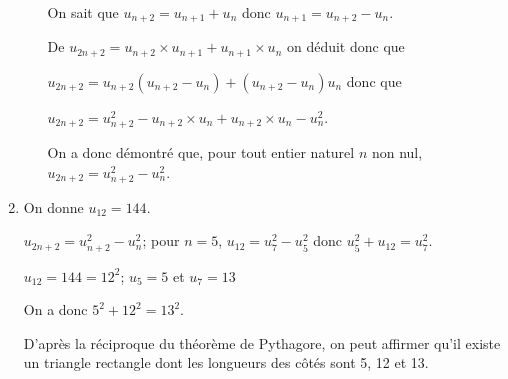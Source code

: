 \documentclass[10pt,a4paper]{article}
\begin{document}
\begin{enumerate}
\begin{enumerate}
On sait que $u_{n+2}=u_{n+1}+u_n$ donc $u_{n+1}=u_{n+2} -u_n$.

De $u_{2n+2} = u_{n+2}\times u_{n+1} + u_{n+1}\times u_n$
on déduit donc que

$u_{2n+2} = u_{n+2}\left ( u_{n+2} -u_n\right ) + \left ( u_{n+2} -u_n\right ) u_n$
donc que 

$u_{2n+2} = u_{n+2}^2  - u_{n+2}\times u_n +  u_{n+2}\times u_n -u_n^2$.

On a donc démontré que, pour tout entier naturel $n$ non nul, 
$u_{2n+2} = u_{n+2}^2  - u_n^2$.

\end{enumerate}

\item On donne $u_{12}=144$.

%

$u_{2n+2} = u_{n+2}^2  - u_n^2$; pour $n=5$, $u_{12} = u_7^2 -u_5^2$ donc $u_5^2+u_{12} = u_7^2$.

$u_{12} = 144 = 12^2$; $u_5=5$ et $u_7=13$

On a donc $5^2+12^2=13^2$.

D'après la réciproque du théorème de Pythagore, on peut affirmer qu'il existe un triangle rectangle dont les longueurs des côtés sont 5, 12 et 13. 
\end{enumerate}
\end{document}

